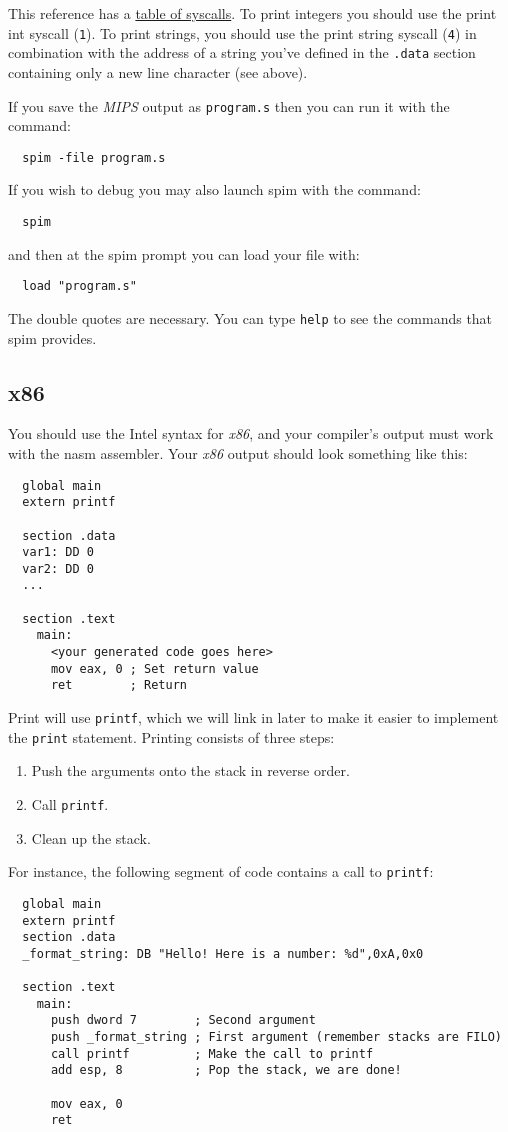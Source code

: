 \documentclass{article}
\newcommand{\code}[1]{\texttt{\textmd{#1}}}
\begin{document}
This reference has a \href{http://students.cs.tamu.edu/tanzir/csce350/reference/syscalls.html}
{table of syscalls}. To print integers you should use the print int syscall (\code{1}). To print
strings, you should use the print string syscall (\code{4}) in combination with the address of a
string you've defined in the \code{.data} section containing only a new line character (see above).

If you save the \textit{MIPS} output as \code{program.s} then you can run it with the command:
\begin{lstlisting}
  spim -file program.s
\end{lstlisting}

If you wish to debug you may also launch spim with the command:
\begin{lstlisting}
  spim
\end{lstlisting}
and then at the spim prompt you can load your file with:
\begin{lstlisting}
  load "program.s"
\end{lstlisting}
The double quotes are necessary. You can type \texttt{help} to see the commands that spim provides.

\subsection{x86}
You should use the Intel syntax for \textit{x86}, and your compiler's output must work with the
nasm assembler. Your \textit{x86} output should look something like this:

\begin{lstlisting}
  global main
  extern printf

  section .data
  var1: DD 0
  var2: DD 0
  ...

  section .text
    main:
      <your generated code goes here>
      mov eax, 0 ; Set return value
      ret        ; Return
\end{lstlisting}

Print will use \code{printf}, which we will link in later to make it easier to implement the
\code{print} statement. Printing consists of three steps:
\begin{enumerate}
  \item Push the arguments onto the stack in reverse order.
  \item Call \code{printf}.
  \item Clean up the stack.
\end{enumerate}

For instance, the following segment of code contains a call to \code{printf}:
\begin{lstlisting}
  global main
  extern printf
  section .data
  _format_string: DB "Hello! Here is a number: %d",0xA,0x0

  section .text
    main:
      push dword 7        ; Second argument
      push _format_string ; First argument (remember stacks are FILO)
      call printf         ; Make the call to printf
      add esp, 8          ; Pop the stack, we are done!

      mov eax, 0
      ret
\end{lstlisting}
\end{document}
